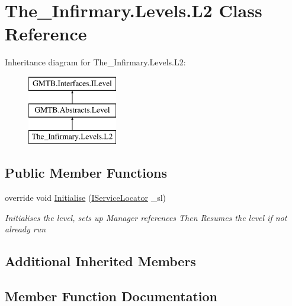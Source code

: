 \hypertarget{class_the___infirmary_1_1_levels_1_1_l2}{}\section{The\+\_\+\+Infirmary.\+Levels.\+L2 Class Reference}
\label{class_the___infirmary_1_1_levels_1_1_l2}
Inheritance diagram for The\+\_\+\+Infirmary.\+Levels.\+L2\+:\begin{figure}[H]
\begin{center}
\leavevmode
\includegraphics[height=3.000000cm]{class_the___infirmary_1_1_levels_1_1_l2}
\end{center}
\end{figure}
\subsection*{Public Member Functions}
\begin{DoxyCompactItemize}
\item 
override void \mbox{\hyperlink{class_the___infirmary_1_1_levels_1_1_l2_adc921dbddf3cfb4274bbebb61d551c41}{Initialise}} (\mbox{\hyperlink{interface_g_m_t_b_1_1_interfaces_1_1_i_service_locator}{I\+Service\+Locator}} \+\_\+sl)
\begin{DoxyCompactList}\small\item\em Initialises the level, sets up Manager references Then Resumes the level if not already run \end{DoxyCompactList}\end{DoxyCompactItemize}
\subsection*{Additional Inherited Members}


\subsection{Member Function Documentation}
\mbox{\label{class_the___infirmary_1_1_levels_1_1_l2_adc921dbddf3cfb4274bbebb61d551c41}} 
